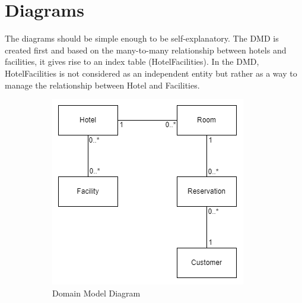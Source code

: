\section*{Diagrams}
The diagrams should be simple enough to be self-explanatory. The DMD is created first and based on the many-to-many relationship between hotels and facilities, it gives rise to an index table (HotelFacilities).
In the DMD, HotelFacilities is not considered as an independent entity but rather as a way to manage the relationship between Hotel and Facilities.

\begin{figure}
  \centering
  \begin{subfigure}[b]{0.45\textwidth}
    \centering
    \includegraphics[width=\textwidth]{figures/SWD_Domain_HotelManagement.png}
    \caption{Domain Model Diagram}\label{DomainModelDiagram}
  \end{subfigure}
  \hfill
  \begin{subfigure}[b]{0.45\textwidth}
    \centering

\end{subfigure}
\end{figure}
